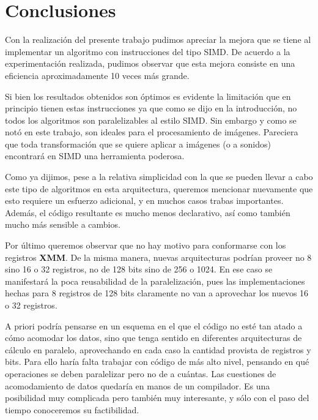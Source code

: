 \section{Conclusiones}

Con la realización del presente trabajo pudimos apreciar la mejora que se tiene
al implementar un algoritmo con instrucciones del tipo SIMD.
De acuerdo a la experimentación realizada, pudimos observar que esta mejora consiste
en una eficiencia aproximadamente 10 veces más grande.

Si bien los resultados obtenidos son óptimos es evidente la limitación que en 
principio tienen estas instrucciones ya que como se dijo en la introducción, no 
todos los algoritmos son paralelizables al estilo SIMD. Sin embargo y como se
notó en este trabajo, son ideales para el procesamiento de imágenes.
Pareciera que toda transformación que se quiere aplicar a imágenes (o a sonidos)
encontrará en SIMD una herramienta poderosa.

Como ya dijimos, pese a la relativa simplicidad con la que se pueden llevar a
cabo este tipo de algoritmos en esta arquitectura, queremos mencionar nuevamente
que esto requiere un esfuerzo adicional, y en muchos casos trabas importantes.
Además, el código resultante es mucho menos declarativo, así como también mucho
más sensible a cambios.

Por último queremos observar que no hay motivo para conformarse con los registros
\textbf{XMM}. De la misma manera, nuevas arquitecturas podrían proveer no 8 sino
16 o 32 registros, no de 128 bits sino de 256 o 1024. En ese caso se manifestará
la poca reusabilidad de la paralelización, pues las implementaciones hechas para
8 registros de 128 bits claramente no van a aprovechar los nuevos 16 o 32 registros.

A priori podría pensarse en un esquema en el que el código no esté tan atado a
cómo acomodar los datos, sino que tenga sentido en diferentes arquitecturas de
cálculo en paralelo, aprovechando en cada caso la cantidad provista de registros
y bits. Para ello haría falta trabajar con código de más alto nivel, pensando en
qué operaciones se deben paralelizar pero no de a cuántas. Las cuestiones de 
acomodamiento de datos quedaría en manos de un compilador. Es una posibilidad
muy complicada pero también muy interesante, y sólo con el paso del tiempo 
conoceremos su factibilidad.

